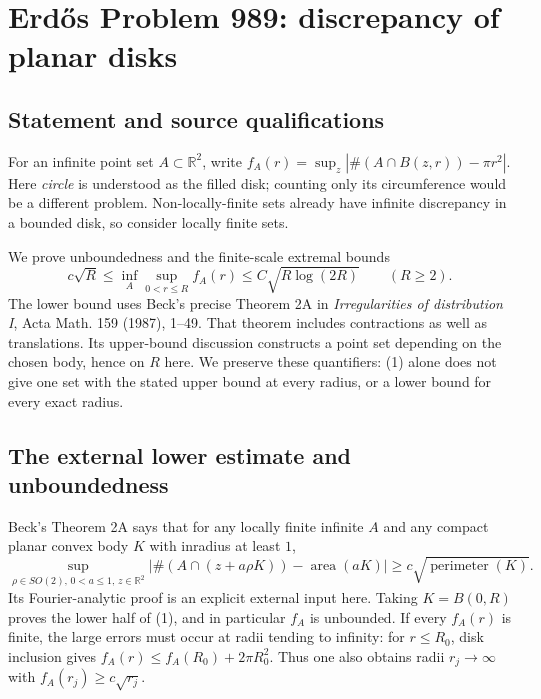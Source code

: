 \section*{Erd\H{o}s Problem 989: discrepancy of planar disks}
\subsection*{Statement and source qualifications}
For an infinite point set $A\subset\mathbb R^2$, write
$f_A(r)=\sup_z|\#(A\cap B(z,r))-\pi r^2|$.
Here \emph{circle} is understood as the filled disk; counting only its circumference would be a different problem. Non-locally-finite sets already have infinite discrepancy in a bounded disk, so consider locally finite sets.

We prove unboundedness and the finite-scale extremal bounds
\[
 c\sqrt R\le \inf_A\sup_{0<r\le R} f_A(r)
 \le C\sqrt{R\log(2R)}\qquad(R\ge2).
 \tag{1}
\]
The lower bound uses Beck's precise Theorem 2A in \emph{Irregularities of distribution I}, Acta Math. 159 (1987), 1--49. That theorem includes contractions as well as translations. Its upper-bound discussion constructs a point set depending on the chosen body, hence on $R$ here. We preserve these quantifiers: (1) alone does not give one set with the stated upper bound at every radius, or a lower bound for every exact radius.

\subsection*{The external lower estimate and unboundedness}
Beck's Theorem 2A says that for any locally finite infinite $A$ and any compact planar convex body $K$ with inradius at least $1$,
\[
 \sup_{\rho\in SO(2),\,0<a\le1,\,z\in\mathbb R^2}
 \left|\#(A\cap(z+a\rho K))-\operatorname{area}(aK)\right|
 \ge c\sqrt{\operatorname{perimeter}(K)}.
\]
Its Fourier-analytic proof is an explicit external input here.
Taking $K=B(0,R)$ proves the lower half of (1), and in particular $f_A$ is unbounded.
If every $f_A(r)$ is finite, the large errors must occur at radii tending to infinity: for $r\le R_0$, disk inclusion gives
$f_A(r)\le f_A(R_0)+2\pi R_0^2$. Thus one also obtains radii $r_j\to\infty$ with $f_A(r_j)\ge c\sqrt{r_j}$.

